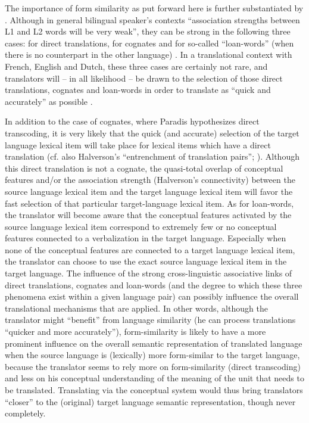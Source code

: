 The importance of form similarity as put forward here is further substantiated by \citet[140]{heredia_bilingual_2014}. Although in general bilingual speaker’s contexts “association strengths between L1 and L2 words will be very weak”, they can be strong in the following three cases: for direct translations, for cognates and for so-called “loan-words” (when there is no counterpart in the other language) \citep[141]{heredia_bilingual_2014}. In a translational context with French, English and Dutch, these three cases are certainly not rare, and translators will – in all likelihood – be drawn to the selection of those direct translations, cognates and loan-words in order to translate as “quick and accurately” as possible \citep{kroll_category_1994}.

In addition to the case of cognates, where Paradis hypothesizes direct transcoding, it is very likely that the quick (and accurate) selection of the target language lexical item will take place for lexical items which have a direct translation (cf. also Halverson’s “entrenchment of translation pairs”; \citeyear[15]{de_sutter_developing_2017}). Although this direct translation is not a cognate, the quasi-total overlap of conceptual features and/or the association strength (Halverson’s connectivity) between the source language lexical item and the target language lexical item will favor the fast selection of that particular target-language lexical item. As for loan-words, the translator will become aware that the conceptual features activated by the source language lexical item correspond to extremely few or no conceptual features connected to a verbalization in the target language. Especially when none of the conceptual features are connected to a target language lexical item, the translator can choose to use the exact source language lexical item in the target language. The influence of the strong cross-linguistic associative links of direct translations, cognates and loan-words (and the degree to which these three phenomena exist within a given language pair) can possibly influence the overall translational mechanisms that are applied. In other words, although the translator might ``benefit'' from language similarity (he can process translations ``quicker and more accurately''), form-similarity is likely to have a more prominent influence on the overall semantic representation of translated language when the source language is (lexically) more form-similar to the target language, because the translator seems to rely more on form-similarity (direct transcoding) and less on his conceptual understanding of the meaning of the unit that needs to be translated. Translating via the conceptual system would thus bring translators ``closer'' to the (original) target language semantic representation, though never completely.

